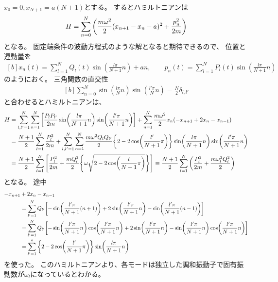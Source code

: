 \documentclass[../../sp_2015.tex]{subfiles}
\begin{document}
\(x_0 = 0,x_{N+1}=a(N+1)\)とする。
するとハミルトニアンは
\begin{equation}\begin{aligned}[b]
    H = \sum_{n=0}^{N}\qty(\frac{m\omega^2}{2}(x_{n+1}-x_{n}-a)^2+\frac{p_n^2}{2m})
\end{aligned}\end{equation}
となる。
固定端条件の波動方程式のような解となると期待できるので、
位置と運動量を
\begin{equation}\begin{aligned}[b]
    x_n(t) = \sum_{l=1}^{N}Q_l(t)\sin(\frac{l\pi}{N+1} n)+an,\qquad
    p_n(t) = \sum_{l=1}^{N}P_l(t)\sin(\frac{l\pi}{N+1} n)
\end{aligned}\end{equation}
のようにおく。
三角関数の直交性
\begin{equation}\begin{aligned}[b]
    \sum_{n=0}^{N}\sin(\frac{l\pi}{N}n)\sin(\frac{l'\pi}{N}n) = \frac{N}{2}\delta_{l,l'}
\end{aligned}\end{equation}
と合わせるとハミルトニアンは、
\begin{equation}\begin{aligned}[b]
    H &= \sum_{l,l'=1}^{N}\sum_{n=1}^{N}\qty[\frac{P_lP_{l'}}{2m}\sin(\frac{l\pi}{N+1}n)\sin(\frac{l'\pi}{N+1}n)]
    +\sum_{n=1}^{N}\frac{m\omega^2}{2} x_n(-x_{n+1}+2x_n-x_{n-1})\\
    &= \frac{N+1}{2}\sum_{l=1}^{N}\frac{P_l^2}{2m}
    +\sum_{l,l'=1}^{N}\sum_{n=1}^{N}\frac{m\omega^2Q_lQ_{l'}}{2} \qty{2-2\cos(\frac{l'}{N+1}\pi)}\sin(\frac{l\pi}{N+1}n)\sin(\frac{l'\pi}{N+1}n)\\
    &= \frac{N+1}{2}\sum_{l=1}^{N}\qty[\frac{P_l^2}{2m}
     +\frac{mQ_l^2}{2}\qty{\omega\sqrt{2-2\cos(\frac{l}{N+1}\pi)}}]
    \equiv \frac{N+1}{2}\sum_{l=1}^{N}\qty(\frac{P_l^2}{2m}
     +\frac{m\omega_l^2Q_l^2}{2})
\end{aligned}\end{equation}
となる。
途中
\begin{equation}\begin{aligned}[b]
    -x_{n+1}&+2x_n-x_{n-1}\\
    &= \sum_{l'=1}^{N}Q_{l'}\qty[
        -\sin(\frac{l'\pi}{N+1}(n+1))+2\sin(\frac{l'\pi}{N+1}n)
        -\sin(\frac{l'\pi}{N+1}(n-1))]\\
    &= \sum_{l'=1}^{N}Q_{l'}\qty[
        -\sin(\frac{l'\pi}{N+1}n)\cos(\frac{l'\pi}{N+1}n)+2\sin(\frac{l'\pi}{N+1}n)
        -\sin(\frac{l'\pi}{N+1}n)\cos(\frac{l'\pi}{N+1}n)]\\
    &= \sum_{l'=1}^{n}\qty{2-2\cos(\frac{l'}{N+1}\pi)}\sin(\frac{l\pi}{N+1}n)
\end{aligned}\end{equation}
を使った。
このハミルトニアンより、各モードは独立した調和振動子で固有振動数が\(\omega_l\)になっているとわかる。
\end{document}
